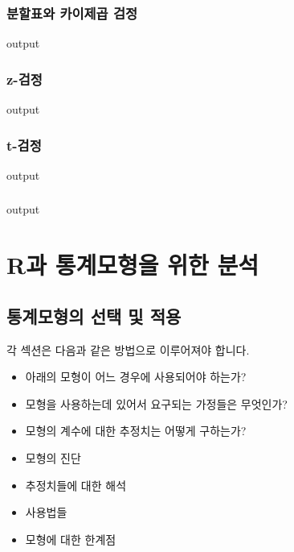 \documentclass{book}
\begin{document}
\section{분할표와 카이제곱 검정}
\begin{Schunk}
\begin{Soutput}
output
\end{Soutput}
\end{Schunk}

\section{z-검정}
\begin{Schunk}
\begin{Soutput}
output
\end{Soutput}
\end{Schunk}

\section{t-검정}
\begin{Schunk}
\begin{Soutput}
output
\end{Soutput}
\end{Schunk}

\section{}
\begin{Schunk}
\begin{Soutput}
output
\end{Soutput}
\end{Schunk}

%
%
%
%

\part{R과 통계모형을 위한 분석}


\chapter{통계모형의 선택 및 적용}

각 섹션은 다음과 같은 방법으로 이루어져야 합니다. 
\begin{itemize}
\item 아래의 모형이 어느 경우에 사용되어야 하는가?
\item 모형을 사용하는데 있어서 요구되는 가정들은 무엇인가?
\item 모형의 계수에 대한 추정치는 어떻게 구하는가?
\item 모형의 진단
\item 추정치들에 대한 해석
\item 사용법들 
\item 모형에 대한 한계점
\end{itemize}
\end{document}
